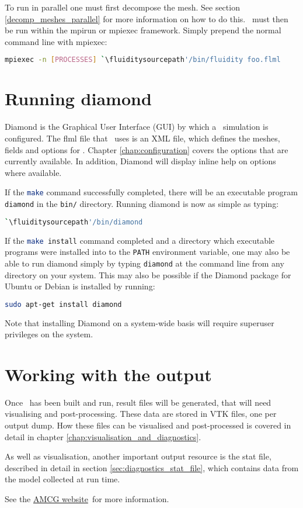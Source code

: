 To run in parallel one must first decompose the mesh. See section
\ref{decomp_meshes_parallel} for more information on how to do this. \fluidity\
must then be run within the mpirun or mpiexec framework. Simply prepend the
normal command line with mpiexec:
\begin{lstlisting}[language=bash]
mpiexec -n [PROCESSES] `\fluiditysourcepath'/bin/fluidity foo.flml
\end{lstlisting}

\section{Running diamond}
\label{sec:running_diamond}

Diamond is the Graphical User Interface (GUI) by which a \fluidity\ simulation
is configured. The flml file that \fluidity\ uses is an XML file, which defines
the meshes, fields and options for \fluidity. Chapter \ref{chap:configuration}
covers the options that are currently available. In addition, Diamond will
display inline help on options where available.

If the \lstinline[language=Bash]+make+ command successfully completed, there
will be an executable program \lstinline[language=Bash]+diamond+ in the
\lstinline[language=Bash]+bin/+ directory. Running diamond is now as simple as
typing:

\begin{lstlisting}[language=Bash]
`\fluiditysourcepath'/bin/diamond
\end{lstlisting}

If the \lstinline[language=Bash]+make install+ command completed and a directory
which executable programs were installed into to the
\lstinline[language=Bash]+PATH+ environment variable, one may also be able to run
diamond simply by typing \lstinline[language=Bash]+diamond+ at the command line
from any directory on your system. This may also be possible if the
Diamond package for Ubuntu or Debian is installed by running:

\begin{lstlisting}[language=Bash]
sudo apt-get install diamond
\end{lstlisting}

Note that installing Diamond on a system-wide basis will require superuser privileges on the system.

\section{Working with the output}
\label{sec:working_with_output}

Once \fluidity\ has been built and run, result files will be generated, that
will need visualising and post-processing. These data are stored in VTK files,
one per output dump.  How these files can be visualised and post-processed is
covered in detail in chapter \ref{chap:visualisation_and_diagnostics}.

As well as visualisation, another important output resource is the stat file,
described in detail in section \ref{sec:diagnostics_stat_file}, which contains
data from the model collected at run time.

See the \href{http://amcg-www.ese.ic.ac.uk/}{AMCG website}\ for more
information.
